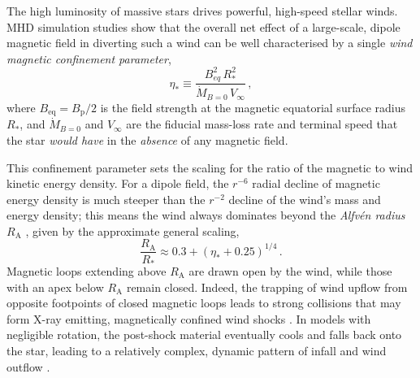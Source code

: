 \documentclass[useAMS,usenatbib]{mn2e}
\newcommand{\etas}{\eta_\ast}
\newcommand{\ra}{R_\mathrm{A}}
\newcommand{\rs}{R_\ast}
\newcommand{\vinf}{V_\infty}
\newcommand{\beq}{B_\mathrm{eq}}
\newcommand{\bp}{B_\mathrm{p}}
\newcommand{\mdot}{\dot{M}_{B=0}}
\begin{document}
The high luminosity of massive stars drives powerful, high-speed stellar winds.
MHD  simulation studies \cite[e.g.][]{2002ApJ...576..413U,2008MNRAS.385...97U}
show that the overall net effect of a large-scale, dipole magnetic field in diverting such a wind can be well
characterised by a single
\textit{wind magnetic confinement parameter},
\begin{equation}
\eta_{\ast} \equiv \frac {B_{eq}^2 \, \rs^2} {\mdot \, \vinf}
\, ,
\label{eq:esdef}
\end{equation}
where $\beq = \bp/2$ is the field strength at the magnetic equatorial surface radius $\rs$,
and $\mdot$ and $\vinf$ are the fiducial mass-loss rate and terminal speed that the star \textit{would have} in the \textit{absence} of any magnetic field.

This confinement parameter sets the scaling for the ratio of the magnetic to wind kinetic energy density.
For a dipole field, the  $r^{-6}$ radial decline of magnetic energy density is much steeper than the $r^{-2}$ decline of the wind's mass and energy density;
this means the wind always dominates beyond the \textit{Alfv\'en radius} $\ra$ \citep{2008MNRAS.385...97U}, 
given by the approximate general scaling, 
\begin{equation}
    \frac{\ra}{\rs} \approx 0.3 + \left ( \etas + 0.25 \right)^{1/4} 
    \, .
    \label{eq:radef}
\end{equation}
Magnetic loops extending above $\ra$ are drawn open by the wind, while those with an apex below $\ra$ remain closed.
Indeed, the trapping of wind upflow from opposite footpoints of closed magnetic loops leads to strong collisions that may form X-ray emitting, magnetically confined wind shocks \citep[MCWS][see \S\ref{sec:xray}]{1997ApJ...485L..29B,1997A&A...323..121B}.
In models with negligible rotation, the post-shock material eventually cools and falls back onto the star, leading to a relatively complex, dynamic pattern of infall and wind outflow \citep[see e.g. lower row of Figure 9 of][also Figure\,\ref{fig:cartoon}]{2008MNRAS.385...97U}.
\end{document}
